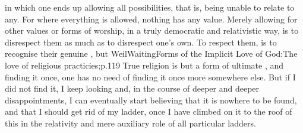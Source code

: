in which one ends up allowing all possibilities, that is, being unable to relate
to any. For where everything is allowed, nothing has any value.
Merely allowing for other values or forms of
worship, in a truly democratic and relativistic way, is to disrespect them as
much as to disrespect one's own. To respect them, is to recognise their genuine
, but \citet{we must have [first] given all our attention, all our faith,
  all our love to a particular religion in order to [be able to] think of any
  other religion with the high degree of attention, faith, and love that is
  proper to it.}{WeilWaiting}{Forms of the Implicit Love of God:The love of
  religious practicies;p.119} True religion is but a form of ultimate
, and finding it once, one has no need of finding it
once more somewhere else. But if I did not find it, I keep looking and, in the
course of deeper and deeper disappointments, I can eventually start believing
that it is nowhere to be found, and that I should get rid of my ladder, once I
have climbed on it to the roof of this  in the relativity and mere
auxiliary role of all particular ladders. 




